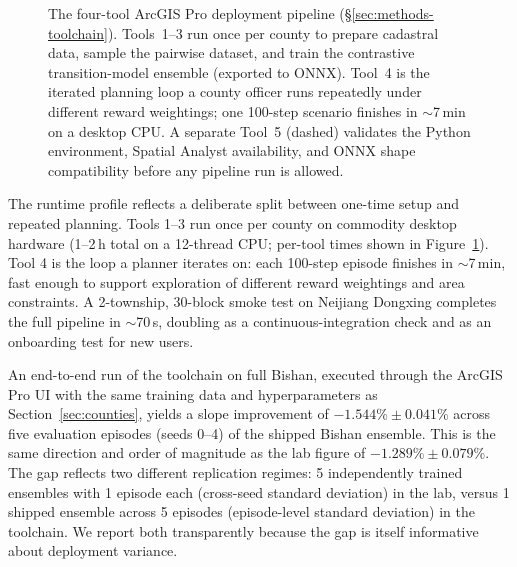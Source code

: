 \documentclass[11pt]{article}
\begin{document}
\begin{figure}[htbp]
{%
}
\caption{The four-tool ArcGIS Pro deployment pipeline (\S\ref{sec:methods-toolchain}). Tools~1--3 run once per county to prepare cadastral data, sample the pairwise dataset, and train the contrastive transition-model ensemble (exported to ONNX). Tool~4 is the iterated planning loop a county officer runs repeatedly under different reward weightings; one 100-step scenario finishes in $\sim$7\,min on a desktop CPU. A separate Tool~5 (dashed) validates the Python environment, Spatial Analyst availability, and ONNX shape compatibility before any pipeline run is allowed.}
\label{fig:toolchain}
\end{figure}

The runtime profile reflects a deliberate split between one-time setup and repeated planning. Tools 1--3 run once per county on commodity desktop hardware (1--2\,h total on a 12-thread CPU; per-tool times shown in Figure~\ref{fig:toolchain}). Tool 4 is the loop a planner iterates on: each 100-step episode finishes in $\sim$7\,min, fast enough to support exploration of different reward weightings and area constraints. A 2-township, 30-block smoke test on Neijiang Dongxing completes the full pipeline in $\sim$70\,s, doubling as a continuous-integration check and as an onboarding test for new users.

An end-to-end run of the toolchain on full Bishan, executed through the ArcGIS Pro UI with the same training data and hyperparameters as Section~\ref{sec:counties}, yields a slope improvement of $-1.544\% \pm 0.041\%$ across five evaluation episodes (seeds 0--4) of the shipped Bishan ensemble. This is the same direction and order of magnitude as the lab figure of $-1.289\% \pm 0.079\%$. The gap reflects two different replication regimes: 5 independently trained ensembles with 1 episode each (cross-seed standard deviation) in the lab, versus 1 shipped ensemble across 5 episodes (episode-level standard deviation) in the toolchain. We report both transparently because the gap is itself informative about deployment variance.
\end{document}

